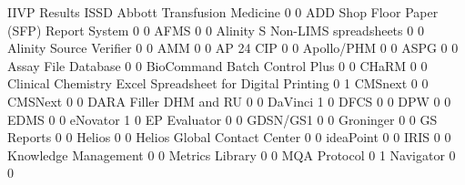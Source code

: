 \documentclass{article}
\begin{document}
\begin{Schunk}
\begin{Soutput}
                                                            IIVP Results ISSD
  Abbott Transfusion Medicine                                          0    0
  ADD Shop Floor Paper (SFP) Report System                             0    0
  AFMS                                                                 0    0
  Alinity S Non-LIMS spreadsheets                                      0    0
  Alinity Source Verifier                                              0    0
  AMM                                                                  0    0
  AP 24 CIP                                                            0    0
  Apollo/PHM                                                           0    0
  ASPG                                                                 0    0
  Assay File Database                                                  0    0
  BioCommand Batch Control Plus                                        0    0
  CHaRM                                                                0    0
  Clinical Chemistry Excel Spreadsheet for Digital Printing            0    1
  CMSnext                                                              0    0
  CMSNext                                                              0    0
  DARA Filler DHM and RU                                               0    0
  DaVinci                                                              1    0
  DFCS                                                                 0    0
  DPW                                                                  0    0
  EDMS                                                                 0    0
  eNovator                                                             1    0
  EP Evaluator                                                         0    0
  GDSN/GS1                                                             0    0
  Groninger                                                            0    0
  GS Reports                                                           0    0
  Helios                                                               0    0
  Helios Global Contact Center                                         0    0
  ideaPoint                                                            0    0
  IRIS                                                                 0    0
  Knowledge Management                                                 0    0
  Metrics Library                                                      0    0
  MQA Protocol                                                         0    1
  Navigator                                                            0    0

\end{Soutput}
\end{Schunk}
\end{document}
